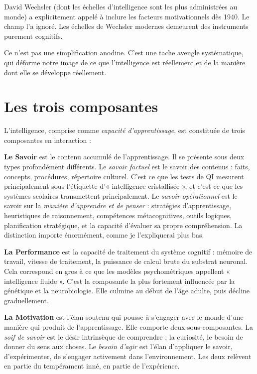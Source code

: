 \documentclass[11pt, twoside, openright]{book}
\begin{document}
David Wechsler (dont les échelles d'intelligence sont les plus administrées au monde) a explicitement appelé à inclure les facteurs motivationnels dès 1940. Le champ l'a ignoré. Les échelles de Wechsler modernes demeurent des instruments purement cognitifs.

Ce n'est pas une simplification anodine. C'est une tache aveugle systématique, qui déforme notre image de ce que l'intelligence est réellement et de la manière dont elle se développe réellement.

\section*{Les trois composantes}

L'intelligence, comprise comme \textit{capacité d'apprentissage}, est constituée de trois composantes en interaction :

\textbf{Le Savoir} est le contenu accumulé de l'apprentissage. Il se présente sous deux types profondément différents. Le \textit{savoir factuel} est le savoir des contenus : faits, concepts, procédures, répertoire culturel. C'est ce que les tests de QI mesurent principalement sous l'étiquette d'« intelligence cristallisée », et c'est ce que les systèmes scolaires transmettent principalement. Le \textit{savoir opérationnel} est le savoir sur la \textit{manière d'apprendre et de penser} : stratégies d'apprentissage, heuristiques de raisonnement, compétences métacognitives, outils logiques, planification stratégique, et la capacité d'évaluer sa propre compréhension. La distinction importe énormément, comme je l'expliquerai plus bas.

\textbf{La Performance} est la capacité de traitement du système cognitif : mémoire de travail, vitesse de traitement, la puissance de calcul brute du substrat neuronal. Cela correspond en gros à ce que les modèles psychométriques appellent « intelligence fluide ». C'est la composante la plus fortement influencée par la génétique et la neurobiologie. Elle culmine au début de l'âge adulte, puis décline graduellement.

\textbf{La Motivation} est l'élan soutenu qui pousse à s'engager avec le monde d'une manière qui produit de l'apprentissage. Elle comporte deux sous-composantes. La \textit{soif de savoir} est le désir intrinsèque de comprendre : la curiosité, le besoin de donner du sens aux choses. Le \textit{besoin d'agir} est l'élan d'appliquer le savoir, d'expérimenter, de s'engager activement dans l'environnement. Les deux relèvent en partie du tempérament inné, en partie de l'expérience.
\end{document}
